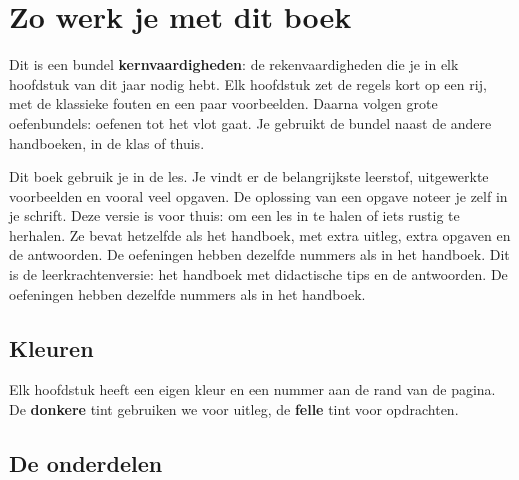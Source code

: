 \chapter*{Zo werk je met dit boek}

\ifkernvaardigheden
Dit is een bundel \textbf{kernvaardigheden}: de rekenvaardigheden die je in elk hoofdstuk van dit jaar nodig hebt. Elk hoofdstuk zet de regels kort op een rij, met de klassieke fouten en een paar voorbeelden. Daarna volgen grote oefenbundels: oefenen tot het vlot gaat. Je gebruikt de bundel naast de andere handboeken, in de klas of thuis.

\fi
\ifhandboek
Dit boek gebruik je in de les. Je vindt er de belangrijkste leerstof, uitgewerkte voorbeelden en vooral veel opgaven. De oplossing van een opgave noteer je zelf in je schrift.
\fi
\ifzelfstudie
Deze versie is voor thuis: om een les in te halen of iets rustig te herhalen. Ze bevat hetzelfde als het handboek, met extra uitleg, extra opgaven en de antwoorden. De oefeningen hebben dezelfde nummers als in het handboek.
\fi
\ifleerkracht
Dit is de leerkrachtenversie: het handboek met didactische tips en de antwoorden. De oefeningen hebben dezelfde nummers als in het handboek.
\fi

\section*{Kleuren}

Elk hoofdstuk heeft een eigen kleur en een nummer aan de rand van de pagina. De \textbf{donkere} tint gebruiken we voor uitleg, de \textbf{felle} tint voor opdrachten.

\section*{De onderdelen}

